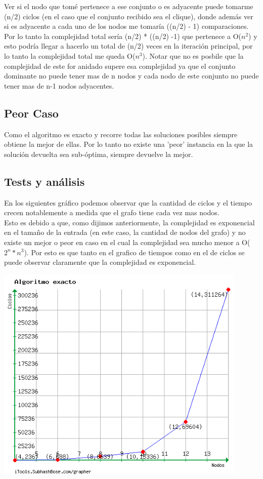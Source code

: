 Ver si el nodo que tomé pertenece a ese conjunto o es adyacente puede tomarme (n/2) ciclos (en el caso que el conjunto recibido sea el clique), donde además ver si es adyacente a cada uno de los nodos me tomaría ((n/2) - 1) comparaciones. Por lo tanto la complejidad total sería (n/2) * ((n/2) -1) que pertenece a O($n^2$) y esto podría llegar a hacerlo un total de (n/2) veces en la iteración principal, por lo tanto la complejidad total me queda O($n^3$). Notar que no es posbile que la complejidad de este for anidado supere esa complejidad ya que el conjunto dominante no puede tener mas de n nodos y cada nodo de este conjunto no puede tener mas de n-1 nodos adyacentes.


\subsection{Peor Caso}

Como el algoritmo es exacto y recorre todas las soluciones posibles siempre obtiene la mejor de ellas. Por lo tanto no existe una 'peor' instancia
en la que la solución devuelta sea sub-óptima, siempre devuelve la mejor. 

\subsection{Tests y análisis}
En los siguientes gráfico podemos observar que la cantidad de ciclos y el tiempo crecen notablemente a medida que el grafo tiene cada vez mas nodos.\\
Esto es debido a que, como dijimos anteriormente, la complejidad es exponencial en el tamaño de la entrada (en este caso, la cantidad de nodos 
del grafo) y no existe un mejor o peor en caso en el cual la complejidad sea mucho menor a O($2^n*n^3$). Por esto es que tanto en el grafico de tiempos
 como en el de ciclos se puede observar claramente que la complejidad es exponencial.

\begin {center}
\includegraphics[width=12cm]{./graficos/exacto.png}
\end {center} 

